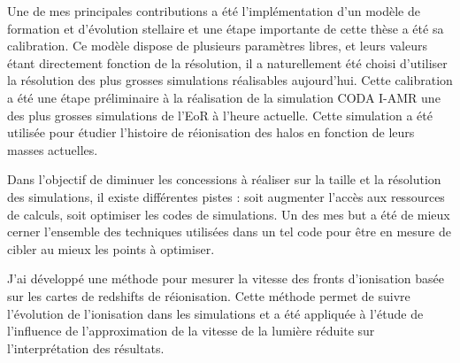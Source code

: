 Une de mes principales contributions a été l'implémentation d'un modèle de formation et d'évolution stellaire et une étape importante de cette thèse a été sa calibration.
Ce modèle dispose de plusieurs paramètres libres, et leurs valeurs étant directement fonction de la résolution, il a naturellement été choisi d'utiliser la résolution des plus grosses simulations réalisables aujourd'hui.
Cette calibration a été une étape préliminaire à la réalisation de la simulation CODA I-AMR une des plus grosses simulations de l'\ac{EoR} à l'heure actuelle.
Cette simulation a été utilisée pour étudier l'histoire de réionisation des halos en fonction de leurs masses actuelles.


Dans l'objectif de diminuer les concessions à réaliser sur la taille et la résolution des simulations, il existe différentes pistes : soit augmenter l'accès aux ressources de calculs, soit optimiser les codes de simulations.
Un des mes but a été de mieux cerner l'ensemble des techniques utilisées dans un tel code pour être en mesure de cibler au mieux les points à optimiser.

J'ai développé une méthode pour mesurer la vitesse des fronts d'ionisation basée sur les cartes de redshifts de réionisation.
Cette méthode permet de suivre l'évolution de l'ionisation dans les simulations et a été appliquée à l'étude de l'influence de l'approximation de la vitesse de la lumière réduite sur l'interprétation des résultats.

